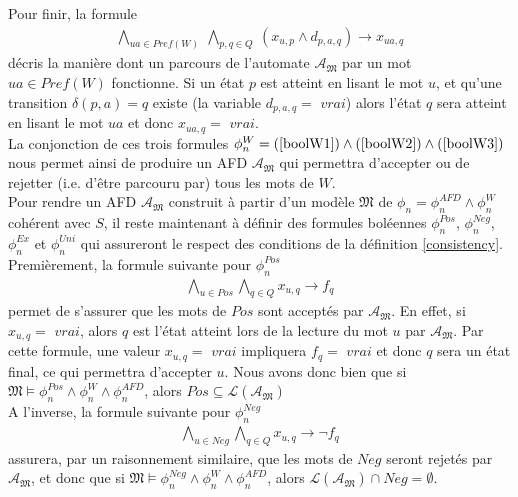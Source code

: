 \documentclass[12pt,a4paper,oneside,titlepage]{report}
\begin{document}
\noindent Pour finir, la formule
\begin{equation}
\label{boolW3}
\begin{aligned} \bigwedge _{ua \in Pref (W)}~ \bigwedge _{p,q \in Q}~ (x_{u, p} \wedge d_{p, a, q}) \rightarrow x_{ua, q} \end{aligned}
\end{equation}
décris la manière dont un parcours de l'automate $\mathcal{A}_\mathfrak{M}$ par un mot $ua\in Pref(W)$ fonctionne. Si un état $p$ est atteint en lisant le mot $u$, et qu'une transition $\delta(p,a)=q$ existe (la variable $d_{p,a,q}=$ $vrai$) alors l'état $q$ sera atteint en lisant le mot $ua$ et donc $x_{ua,q}=$ $vrai$.\\

\noindent La conjonction de ces trois formules $\phi^W_n=(\ref{boolW1})\land(\ref{boolW2})\land(\ref{boolW3})$ nous permet ainsi de produire un AFD $\mathcal{A}_\mathfrak{M}$ qui permettra d'accepter ou de rejetter (i.e. d'être parcouru par) tous les mots de $W$.\\

\noindent Pour rendre un AFD $\mathcal{A}_\mathfrak{M}$ construit à partir d'un modèle $\mathfrak{M}$ de $\phi_n=\phi_n^{AFD}\land\phi^W_n$ cohérent avec $S$, il reste maintenant à définir des formules boléennes $\phi_n^{Pos}$, $\phi_n^{Neg}$, $\phi_n^{Ex}$ et $\phi_n^{Uni}$ qui assureront le respect des conditions de la définition \ref{consistency}.\\

\noindent Premièrement, la formule suivante pour $\phi_n^{Pos}$ 
\begin{equation}
\label{boolPos}
\begin{aligned} \bigwedge_{u\in Pos} \bigwedge_{q\in Q} x_{u,q} \rightarrow f_q \end{aligned}
\end{equation} 
permet de s'assurer que les mots de $Pos$ sont acceptés par $\mathcal{A}_\mathfrak{M}$. En effet, si $x_{u,q}=$ $vrai$, alors $q$ est l'état atteint lors de la lecture du mot $u$ par $\mathcal{A}_\mathfrak{M}$. Par cette formule, une valeur $x_{u,q}=$ $vrai$ impliquera $f_q=$ $vrai$ et donc $q$ sera un état final, ce qui permettra d'accepter $u$. Nous avons donc bien que si $\mathfrak{M}\models \phi_n^{Pos}\land\phi_n^W\land\phi_n^{AFD}$, alors $Pos\subseteq \mathcal{L}(\mathcal{A}_\mathfrak{M})$\\

\noindent A l'inverse, la formule suivante pour $\phi_n^{Neg}$ 
\begin{equation}
\label{boolNeg}
\begin{aligned} \bigwedge_{u\in Neg} \bigwedge_{q\in Q} x_{u,q} \rightarrow \neg f_q \end{aligned}
\end{equation} 
assurera, par un raisonnement similaire, que les mots de $Neg$ seront rejetés par $\mathcal{A}_\mathfrak{M}$, et donc que si $\mathfrak{M}\models \phi_n^{Neg}\land\phi_n^W\land\phi_n^{AFD}$, alors $\mathcal{L}(\mathcal{A}_\mathfrak{M})\cap Neg=\emptyset$.\\
\end{document}
